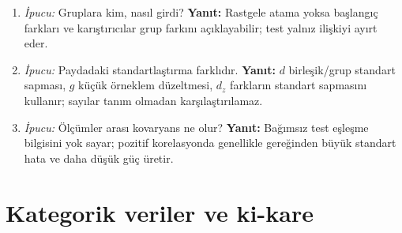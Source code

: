 \begin{enumerate}[leftmargin=*,itemsep=5pt]
\item \emph{İpucu:} Gruplara kim, nasıl girdi?
\textbf{Yanıt:} Rastgele atama yoksa başlangıç farkları ve karıştırıcılar
grup farkını açıklayabilir; test yalnız ilişkiyi ayırt eder.
\item \emph{İpucu:} Paydadaki standartlaştırma farklıdır.
\textbf{Yanıt:} $d$ birleşik/grup standart sapması, $g$ küçük örneklem
düzeltmesi, $d_z$ farkların standart sapmasını kullanır; sayılar tanım olmadan
karşılaştırılamaz.
\item \emph{İpucu:} Ölçümler arası kovaryans ne olur?
\textbf{Yanıt:} Bağımsız test eşleşme bilgisini yok sayar; pozitif korelasyonda
genellikle gereğinden büyük standart hata ve daha düşük güç üretir.
\end{enumerate}

\section{Kategorik veriler ve ki-kare}

